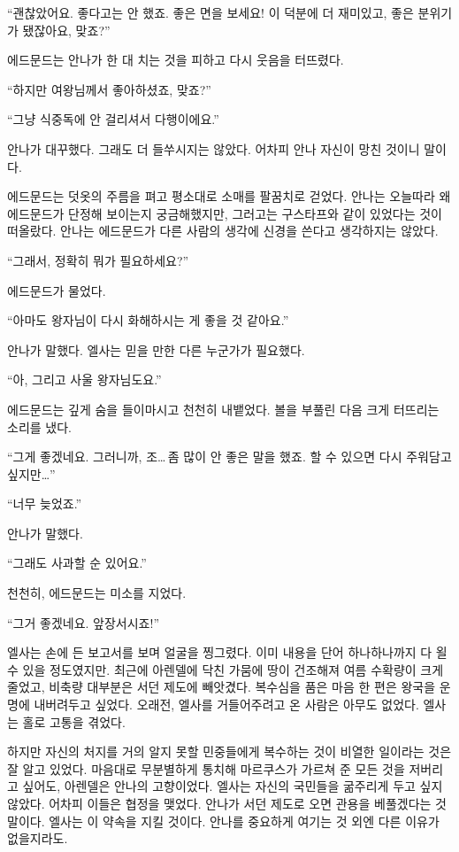 ``괜찮았어요. 좋다고는 안 했죠. 좋은 면을 보세요! 이 덕분에 더 재미있고, 좋은 분위기가 됐잖아요, 맞죠?''

에드문드는 안나가 한 대 치는 것을 피하고 다시 웃음을 터뜨렸다.

``하지만 여왕님께서 좋아하셨죠, 맞죠?''

``그냥 식중독에 안 걸리셔서 다행이에요.''

안나가 대꾸했다. 그래도 더 들쑤시지는 않았다. 어차피 안나 자신이 망친 것이니 말이다.

에드문드는 덧옷의 주름을 펴고 평소대로 소매를 팔꿈치로 걷었다. 안나는 오늘따라 왜 에드문드가 단정해 보이는지 궁금해했지만, 그러고는 구스타프와 같이 있었다는 것이 떠올랐다. 안나는 에드문드가 다른 사람의 생각에 신경을 쓴다고 생각하지는 않았다.

``그래서, 정확히 뭐가 필요하세요?''

에드문드가 물었다.

``아마도 왕자님이 다시 화해하시는 게 좋을 것 같아요.''

안나가 말했다. 엘사는 믿을 만한 다른 누군가가 필요했다.

``아, 그리고 사울 왕자님도요.''

에드문드는 깊게 숨을 들이마시고 천천히 내뱉었다. 볼을 부풀린 다음 크게 터뜨리는 소리를 냈다.

``그게 좋겠네요. 그러니까, 조\ldots\,좀 많이 안 좋은 말을 했죠. 할 수 있으면 다시 주워담고 싶지만\ldots''

``너무 늦었죠.''

안나가 말했다.

``그래도 사과할 순 있어요.''

천천히, 에드문드는 미소를 지었다.

``그거 좋겠네요. 앞장서시죠!''

\textbreak

엘사는 손에 든 보고서를 보며 얼굴을 찡그렸다. 이미 내용을 단어 하나하나까지 다 욀 수 있을 정도였지만. 최근에 아렌델에 닥친 가뭄에 땅이 건조해져 여름 수확량이 크게 줄었고, 비축량 대부분은 서던 제도에 빼앗겼다. 복수심을 품은 마음 한 편은 왕국을 운명에 내버려두고 싶었다. 오래전, 엘사를 거들어주려고 온 사람은 아무도 없었다. 엘사는 홀로 고통을 겪었다.

하지만 자신의 처지를 거의 알지 못할 민중들에게 복수하는 것이 비열한 일이라는 것은 잘 알고 있었다. 마음대로 무분별하게 통치해 마르쿠스가 가르쳐 준 모든 것을 저버리고 싶어도, 아렌델은 안나의 고향이었다. 엘사는 자신의 국민들을 굶주리게 두고 싶지 않았다. 어차피 이들은 협정을 맺었다. 안나가 서던 제도로 오면 관용을 베풀겠다는 것 말이다. 엘사는 이 약속을 지킬 것이다. 안나를 중요하게 여기는 것 외엔 다른 이유가 없을지라도.

